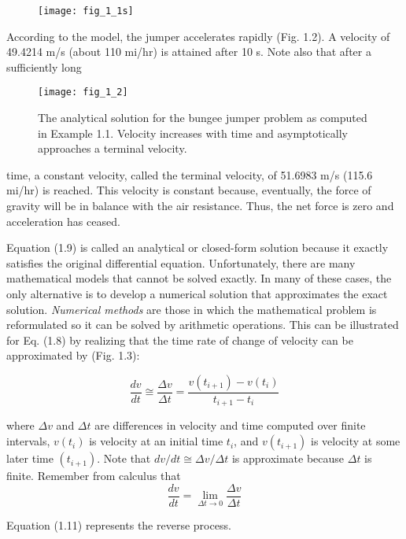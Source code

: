 \documentclass[../main.tex]{subfiles}
\begin{document}
\begin{figure}[H]
	\centering
	\texttt{[image: fig\_1\_1s]}
   \label{fig:fig_1_1s}
\end{figure}



According to the model, the jumper accelerates rapidly (Fig. 1.2). A velocity of
49.4214 m/s (about 110 mi/hr) is attained after 10 s. Note also that after a sufficiently long

\begin{figure}[H]
	\centering
	\texttt{[image: fig\_1\_2]}
   \caption{\textsf{The analytical solution for the bungee jumper problem as computed in Example 1.1. Velocity
increases with time and asymptotically approaches a terminal velocity.}}
   \label{fig:fig_1_2}
\end{figure}

time, a constant velocity, called the terminal velocity, of 51.6983 m/s (115.6 mi/hr) is
reached. This velocity is constant because, eventually, the force of gravity will be in balance with the air resistance. Thus, the net force is zero and acceleration has ceased.


Equation (1.9) is called an analytical or closed-form solution because it exactly satisfies the original differential equation. Unfortunately, there are many mathematical models
that cannot be solved exactly. In many of these cases, the only alternative is to develop a
numerical solution that approximates the exact solution.
\textit{Numerical methods} are those in which the mathematical problem is reformulated so it
can be solved by arithmetic operations. This can be illustrated for Eq. (1.8) by realizing that
the time rate of change of velocity can be approximated by (Fig. 1.3):

\begin{equation}
\tag{1.11}
\dfrac{dv}{dt}\cong\dfrac{\Delta v}{\Delta t} = \dfrac{v(t_{i+1})-v(t_i)}{t_{i+1}-t_i}
\end{equation}

where $\Delta v$ and $\Delta t$ are differences in velocity and time computed over finite intervals, $v(t_i)$
is velocity at an initial time $t_i$, and $v(t_{i+1})$ is velocity at some later time $(t_{i+1})$. Note that
$dv/dt \cong \Delta v / \Delta t$ is approximate because $ \Delta t$ is finite. Remember from calculus that
$$
\dfrac{dv}{dt} = \lim_{\Delta t\to 0} \dfrac{\Delta v}{ \Delta t}
$$

Equation (1.11) represents the reverse process.
\end{document}

